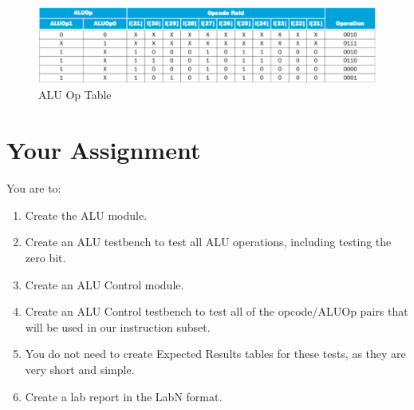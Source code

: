 \begin{figure}
	\caption{ALU Op Table}\label{fig:alu_op_opcode_table}
	\begin{center}
		\includegraphics[width=4.75in]{../images/alu_op_opcode_table.png}
	\end{center}
\end{figure} 

\section{Your Assignment}

You are to:
\begin{enumerate}
\item Create the ALU module.
\item Create an ALU testbench to test all ALU operations, including testing the zero bit.
\item Create an ALU Control module.
\item Create an ALU Control testbench to test all of the opcode/ALUOp pairs that will be used in our instruction subset.
\item You do not need to create Expected Results tables for these tests, as they are very short and simple.
\item Create a lab report in the LabN format.
\end{enumerate} 